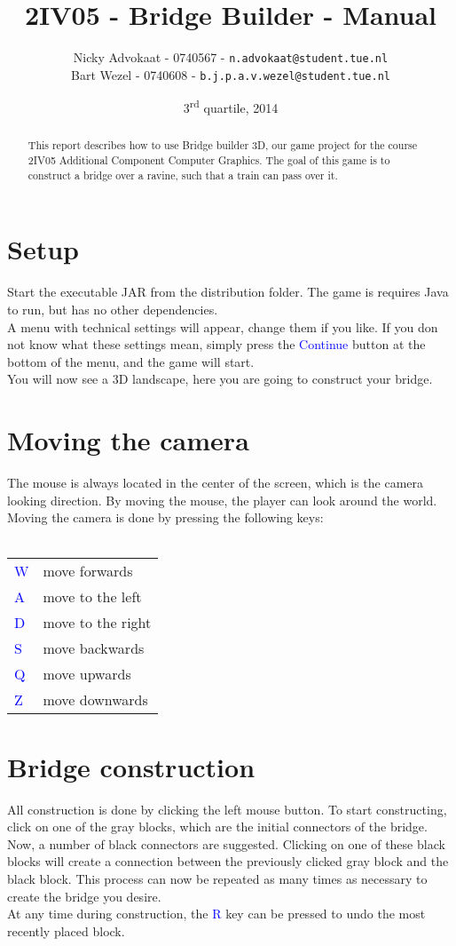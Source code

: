 \documentclass[a4paper,twoside,11pt]{article}
\title{\vspace{-\baselineskip}\sffamily\bfseries 2IV05 - Bridge Builder - Manual}
\author{
Nicky Advokaat - 0740567 - {\tt n.advokaat@student.tue.nl} \\
Bart Wezel - 0740608 - {\tt b.j.p.a.v.wezel@student.tue.nl}\\
}
\date{3\textsuperscript{rd} quartile, 2014}
\numberwithin{equation}{section}
\newcommand{\name}{Bridge builder 3D}
\newcommand{\key}[1]{\textcolor{blue}{#1}}
\begin{document}
\maketitle
\thispagestyle{empty}
\begin{abstract}
This report  describes how to use \name , our game project  for the course 2IV05 Additional Component Computer Graphics. The goal of this game is to construct a bridge over a ravine, such that a train can pass over it.
\end{abstract}

\section{Setup}
Start the executable JAR from the distribution folder. The game is requires Java to run, but has no other dependencies.\\
A menu with technical settings will appear, change them if you like. If you don not know what these settings mean, simply press the \key{Continue} button at the bottom of the menu, and the game will start.\\
You will now see a 3D landscape, here you are going to construct your bridge.

\section{Moving the camera}
The mouse is always located in the center of the screen, which is the camera looking direction. By moving the mouse, the player can look around the world.
Moving the camera is done by pressing the following keys: \\
\\
\begin{tabular}{ l l }
  \key{W} & move forwards  \\
  \key{A} & move to the left \\
  \key{D} & move to the right \\
  \key{S} & move backwards \\
  \key{Q} & move upwards \\
  \key{Z} & move downwards \\
\end{tabular}

\section{Bridge construction}
All construction is done by clicking the left mouse button. To start constructing, click on one of the gray blocks, which are the initial connectors of the bridge. Now, a number of black connectors are suggested. Clicking on one of these black blocks will create a connection between the previously clicked gray block and the black block. This process can now be repeated as many times as necessary to create the bridge you desire.\\
At any time during construction, the \key{R} key can be pressed to undo the most recently placed block.
\end{document}
